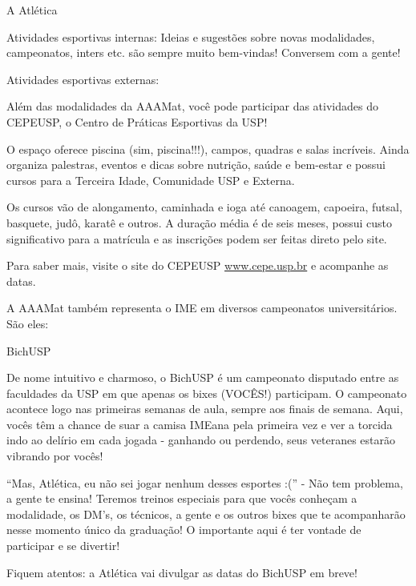 \begin{secao}{A Atlética}
\begin{subsecao}{Atividades esportivas internas:}
Ideias e sugestões sobre novas modalidades, campeonatos, inters etc. são
sempre muito bem-vindas! Conversem com a gente!

\end{subsecao}

\begin{subsecao}{Atividades esportivas externas:}

Além das modalidades da AAAMat, você pode participar das atividades do CEPEUSP, o 
Centro de Práticas Esportivas da USP! 

O espaço oferece piscina (sim, piscina!!!), campos, quadras e salas incríveis.
Ainda organiza palestras, eventos e dicas sobre nutrição, saúde e bem-estar e possui 
cursos para a Terceira Idade, Comunidade USP e Externa. 

Os cursos vão de alongamento, caminhada e ioga até canoagem, capoeira, futsal, 
basquete, judô, karatê e outros. A duração média é de seis meses, possui custo 
significativo para a matrícula e as inscrições podem ser feitas direto pelo site. 

Para saber mais, visite o site do CEPEUSP \url{www.cepe.usp.br} e acompanhe as
datas. 

\end{subsecao}

A AAAMat também representa o IME em diversos campeonatos universitários. São
eles:

\begin{subsecao}{BichUSP}

De nome intuitivo e charmoso, o BichUSP é um campeonato disputado entre as
faculdades da USP em que apenas os bixes (VOCÊS!) participam. O campeonato
acontece logo nas primeiras semanas de aula, sempre aos finais de semana. Aqui,
vocês têm a chance de suar a camisa IMEana pela primeira vez e ver a torcida
indo ao delírio em cada jogada - ganhando ou perdendo, seus veteranes estarão
vibrando por vocês!

``Mas, Atlética, eu não sei jogar nenhum desses esportes :('' - Não tem
problema, a gente te ensina! Teremos treinos especiais para que vocês conheçam
a modalidade, os DM’s, os técnicos, a gente e os outros bixes que te
acompanharão nesse momento único da graduação! O importante aqui é ter vontade
de participar e se divertir!

Fiquem atentos: a Atlética vai divulgar as datas do BichUSP em breve!


\end{subsecao}
\end{secao}
